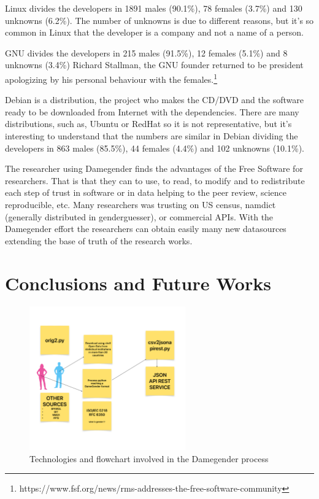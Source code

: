 \documentclass[a4paper]{article}
\begin{document}
Linux divides the developers in 1891 males (90.1\%), 78 females
(3.7\%) and 130 unknowns (6.2\%). The number of unknowns is due to
different reasons, but it's so common in Linux that the developer is a
company and not a name of a person.

GNU divides the developers in 215 males (91.5\%), 12 females (5.1\%)
and 8 unknowns (3.4\%) Richard Stallman, the GNU founder returned to
be president apologizing by his personal behaviour with the
females.\footnote{https://www.fsf.org/news/rms-addresses-the-free-software-community}

Debian is a distribution, the project who makes the CD/DVD and the
software ready to be downloaded from Internet with the
dependencies. There are many distributions, such as, Ubuntu or RedHat
so it is not representative, but it's interesting to understand that
the numbers are similar in Debian dividing the developers in 863 males
(85.5\%), 44 females (4.4\%) and 102 unknowns (10.1\%).

The researcher using Damegender finds the advantages of the Free Software
for researchers. That is that they can to use, to read, to modify and
to redistribute each step of trust in software or in data helping to the
peer review, science reproducible, etc. Many researchers
was trusting on US census, namdict (generally distributed in genderguesser),
or commercial APIs. With the Damegender effort the researchers can obtain easily 
many new datasources extending the base of truth of the research works.


\section{Conclusions and Future Works}
\label{sec:conclusions}

\begin{figure}
  \centering
  \includegraphics[width=0.6\textwidth]{images/flowchart.pdf}
  \caption[Caption for flowchart]{Technologies and flowchart involved in the Damegender process}
\end{figure}
\end{document}
